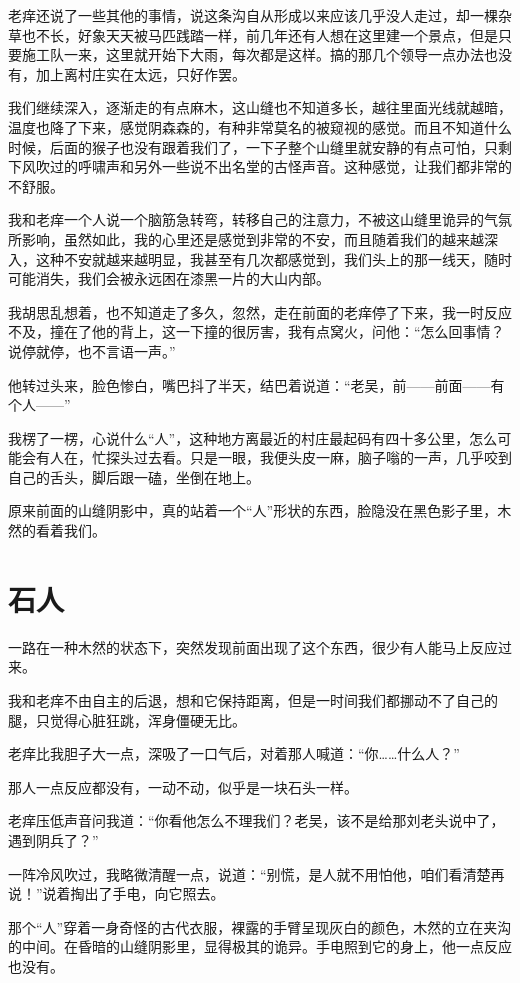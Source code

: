 老痒还说了一些其他的事情，说这条沟自从形成以来应该几乎没人走过，却一棵杂草也不长，好象天天被马匹践踏一样，前几年还有人想在这里建一个景点，但是只要施工队一来，这里就开始下大雨，每次都是这样。搞的那几个领导一点办法也没有，加上离村庄实在太远，只好作罢。

我们继续深入，逐渐走的有点麻木，这山缝也不知道多长，越往里面光线就越暗，温度也降了下来，感觉阴森森的，有种非常莫名的被窥视的感觉。而且不知道什么时候，后面的猴子也没有跟着我们了，一下子整个山缝里就安静的有点可怕，只剩下风吹过的呼啸声和另外一些说不出名堂的古怪声音。这种感觉，让我们都非常的不舒服。

我和老痒一个人说一个脑筋急转弯，转移自己的注意力，不被这山缝里诡异的气氛所影响，虽然如此，我的心里还是感觉到非常的不安，而且随着我们的越来越深入，这种不安就越来越明显，我甚至有几次都感觉到，我们头上的那一线天，随时可能消失，我们会被永远困在漆黑一片的大山内部。

我胡思乱想着，也不知道走了多久，忽然，走在前面的老痒停了下来，我一时反应不及，撞在了他的背上，这一下撞的很厉害，我有点窝火，问他：“怎么回事情？说停就停，也不言语一声。”

他转过头来，脸色惨白，嘴巴抖了半天，结巴着说道：“老吴，前——前面——有个人——”

我楞了一楞，心说什么“人”，这种地方离最近的村庄最起码有四十多公里，怎么可能会有人在，忙探头过去看。只是一眼，我便头皮一麻，脑子嗡的一声，几乎咬到自己的舌头，脚后跟一磕，坐倒在地上。

原来前面的山缝阴影中，真的站着一个“人”形状的东西，脸隐没在黑色影子里，木然的看着我们。

\chapter{石人}

一路在一种木然的状态下，突然发现前面出现了这个东西，很少有人能马上反应过来。

我和老痒不由自主的后退，想和它保持距离，但是一时间我们都挪动不了自己的腿，只觉得心脏狂跳，浑身僵硬无比。

老痒比我胆子大一点，深吸了一口气后，对着那人喊道：“你……什么人？”

那人一点反应都没有，一动不动，似乎是一块石头一样。

老痒压低声音问我道：“你看他怎么不理我们？老吴，该不是给那刘老头说中了，遇到阴兵了？”

一阵冷风吹过，我略微清醒一点，说道：“别慌，是人就不用怕他，咱们看清楚再说！”说着掏出了手电，向它照去。

那个“人”穿着一身奇怪的古代衣服，裸露的手臂呈现灰白的颜色，木然的立在夹沟的中间。在昏暗的山缝阴影里，显得极其的诡异。手电照到它的身上，他一点反应也没有。


